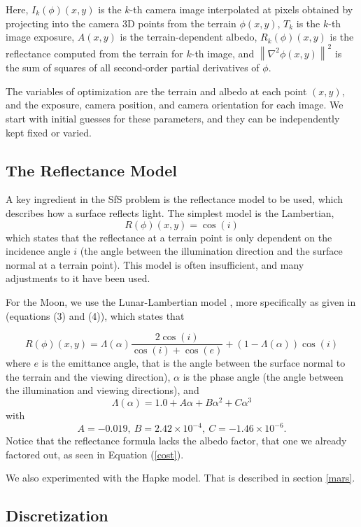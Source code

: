 \documentclass[12pt,oneside]{article}
\begin{document}
Here, $I_k(\phi)(x, y)$ is the $k$-th camera image interpolated at
pixels obtained by projecting into the camera 3D points from the terrain
$\phi(x, y)$, $T_k$ is the $k$-th image exposure, $A(x, y)$ is the
terrain-dependent albedo, $R_k(\phi)(x, y)$ is the reflectance computed
from the terrain for $k$-th image, and $\left\|\nabla^2 \phi(x, y) \right\|^2 $ is the sum
of squares of all second-order partial derivatives of $\phi.$

The variables of optimization are the terrain and albedo at each point
$(x, y)$, and the exposure, camera position, and camera orientation for
each image. We start with initial guesses for these parameters, and they
can be independently kept fixed or varied.

\subsection{The Reflectance Model}
\label{reflectance}

A key ingredient in the SfS problem is the reflectance model to be used, which describes
how a surface reflects light. The simplest model is the Lambertian,
$$
R(\phi)(x, y) = \cos(i)
$$
which states that the reflectance at a terrain point is only dependent
on the incidence angle $i$ (the angle between the illumination
direction and the surface normal at a terrain point). This model is
often insufficient, and many adjustments to it have been used.

For the Moon, we use the Lunar-Lambertian model
\citet{mcewen1991photometric}, more specifically as given in
\cite{lohse2006derivation} (equations (3) and (4)), which states that

$$
R(\phi)(x, y) = \Lambda(\alpha) \frac{2\cos (i)}{\cos(i) + \cos(e)}
 + \left(1-\Lambda(\alpha)\right) \cos(i)
$$
where $e$ is the emittance angle, that is the angle between the surface
normal to the terrain and the viewing direction), $\alpha$ is the phase
angle (the angle between the illumination and viewing directions), and
$$
\Lambda(\alpha) = 1.0 + A\alpha + B\alpha^2 + C\alpha^3
$$
with
$$
A = -0.019, \  B = 2.42\times 10^{-4}, \  C = -1.46 \times 10^{-6}.
$$
Notice that the reflectance formula lacks the albedo factor, that one we
already factored out, as seen in Equation (\ref{cost}).

We also experimented with the Hapke model. That is described in section 
\ref{mars}.

\subsection{Discretization}
\end{document}

